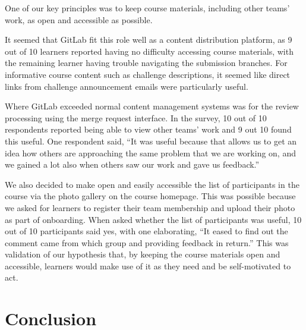 \documentclass[12pt,twoside]{mitthesis}
\newcommand{\review}[1]{{#1}}
\begin{document}
\review{One of our key principles was to keep course materials, including other teams' work, as open and accessible as possible. 

It seemed that GitLab fit this role well as a content distribution platform, as 9 out of 10 learners reported having no difficulty accessing course materials, with the remaining learner having trouble navigating the submission branches. For informative course content such as challenge descriptions, it seemed like direct links from challenge announcement emails were particularly useful.

Where GitLab exceeded normal content management systems was for the review processing using the merge request interface. In the survey, 10 out of 10 respondents reported being able to view other teams' work and 9 out 10 found this useful. One respondent said, ``It was useful because that allows us to get an idea how others are approaching the same problem that we are working on, and we gained a lot also when others saw our work and gave us feedback.'' 

We also decided to make open and easily accessible the list of participants in the course via the photo gallery on the course homepage. This was possible because we asked for learners to register their team membership and upload their photo as part of onboarding. When asked whether the list of participants was useful, 10 out of 10 participants said yes, with one elaborating, ``It eased to find out the comment came from which group and providing feedback in return.'' This was validation of our hypothesis that, by keeping the course materials open and accessible, learners would make use of it as they need and be self-motivated to act.}

\chapter{Conclusion}
\end{document}

